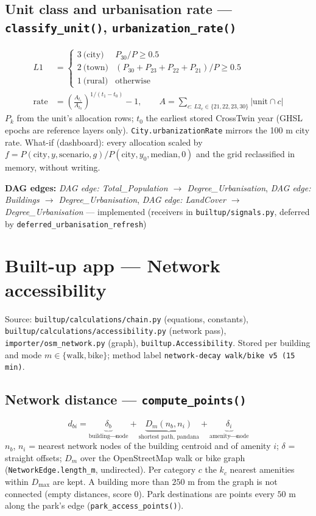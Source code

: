 \documentclass[11pt]{article}
\newcommand{\code}[1]{\texttt{#1}}
\newcommand{\dagedge}[1]{\textit{DAG edge: #1}}
\newcommand{\statusdone}{\textcolor{green!50!black}{implemented}}
\begin{document}
\subsection{Unit class and urbanisation rate --- \code{classify\_unit()}, \code{urbanization\_rate()}}
\begin{align}
  L1 &= \begin{cases} 3\ \text{(city)} & P_{30}/P \ge 0.5 \\ 2\ \text{(town)} & (P_{30}+P_{23}+P_{22}+P_{21})/P \ge 0.5 \\ 1\ \text{(rural)} & \text{otherwise} \end{cases} \\
  \text{rate} &= \left(\frac{A_{t_1}}{A_{t_0}}\right)^{1/(t_1 - t_0)} - 1, \qquad A = \sum_{c:\ L2_c \in \{21,22,23,30\}} |\text{unit} \cap c|
\end{align}
$P_k$ from the unit's allocation rows; $t_0$ the earliest stored CrossTwin year (GHSL epochs are reference layers only). \code{City.urbanizationRate} mirrors the 100 m city rate. What-if (dashboard): every allocation scaled by $f = P(\text{city}, y, \text{scenario}, g) / P(\text{city}, y_0, \text{median}, 0)$ and the grid reclassified in memory, without writing.

\textbf{DAG edges:} \dagedge{Total\_Population $\rightarrow$ Degree\_Urbanisation}, \dagedge{Buildings $\rightarrow$ Degree\_Urbanisation}, \dagedge{LandCover $\rightarrow$ Degree\_Urbanisation} --- \statusdone{} (receivers in \code{builtup/signals.py}, deferred by \code{deferred\_urbanisation\_refresh})

\section{Built-up app --- Network accessibility}
\label{sec:accessibility}
Source: \code{builtup/calculations/chain.py} (equations, constants), \code{builtup/calculations/accessibility.py} (network pass), \code{importer/osm\_network.py} (graph), \code{builtup.Accessibility}. Stored per building and mode $m \in \{\text{walk}, \text{bike}\}$; method label \code{network-decay walk/bike v5 (15 min)}.

\subsection{Network distance --- \code{compute\_points()}}
\begin{equation}
  d_{bi} = \underbrace{\delta_b}_{\text{building}\to\text{node}} + \underbrace{D_m(n_b, n_i)}_{\text{shortest path, pandana}} + \underbrace{\delta_i}_{\text{amenity}\to\text{node}}
\end{equation}
$n_b$, $n_i$ = nearest network nodes of the building centroid and of amenity $i$; $\delta$ = straight offsets; $D_m$ over the OpenStreetMap walk or bike graph (\code{NetworkEdge.length\_m}, undirected). Per category $c$ the $k_c$ nearest amenities within $D_{\max}$ are kept. A building more than $250$ m from the graph is not connected (empty distances, score $0$). Park destinations are points every $50$ m along the park's edge (\code{park\_access\_points()}).
\end{document}
